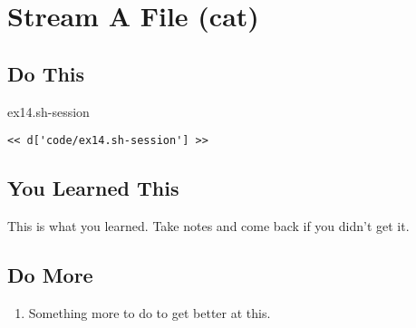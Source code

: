 \chapter{Stream A File (cat)}

\section{Do This}

\begin{code}{ex14.sh-session}
\begin{Verbatim}
<< d['code/ex14.sh-session'] >>
\end{Verbatim}
\end{code}


\section{You Learned This}

This is what you learned.  Take notes and come back if you didn't get it.

\section{Do More}

\begin{enumerate}
\item Something more to do to get better at this.
\end{enumerate}

